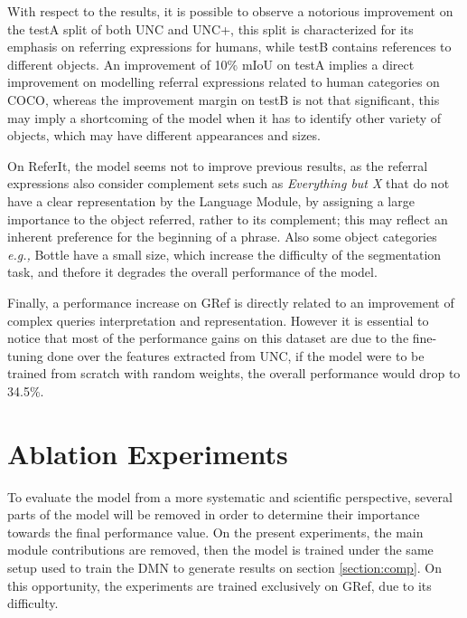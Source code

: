 With respect to the results, it is possible to observe a notorious improvement on the testA split of both UNC and UNC+, this split is characterized for its emphasis on referring expressions for humans, while testB contains references to different objects. An improvement of 10\% mIoU on testA implies a direct improvement on modelling referral expressions related to human categories on COCO, whereas the improvement margin on testB is not that significant, this may imply a shortcoming of the model when it has to identify other variety of objects, which may have different appearances and sizes.

On ReferIt, the model seems not to improve previous results, as the referral expressions also consider complement sets such as \textit{Everything but X} that do not have a clear representation by the Language Module, by assigning a large importance to the object referred, rather to its complement; this may reflect an inherent preference for the beginning of a phrase. Also some object categories \textit{e.g.,} Bottle have a small size, which increase the difficulty of the segmentation task, and thefore it degrades the overall performance of the model.

Finally, a performance increase on GRef is directly related to an improvement of complex queries interpretation and representation. However it is essential to notice that most of the performance gains on this dataset are due to the fine-tuning done over the features extracted from UNC, if the model were to be trained from scratch with random weights, the overall performance would drop to 34.5\%.

\section{Ablation Experiments}
\label{section:ablation}
To evaluate the model from a more systematic and scientific perspective, several parts of the model will be removed in order to determine their importance towards the final performance value. On the present experiments, the main module contributions are removed, then the model is trained under the same setup used to train the DMN to generate results on section \ref{section:comp}. On this opportunity, the experiments are trained exclusively on GRef, due to its difficulty. %

